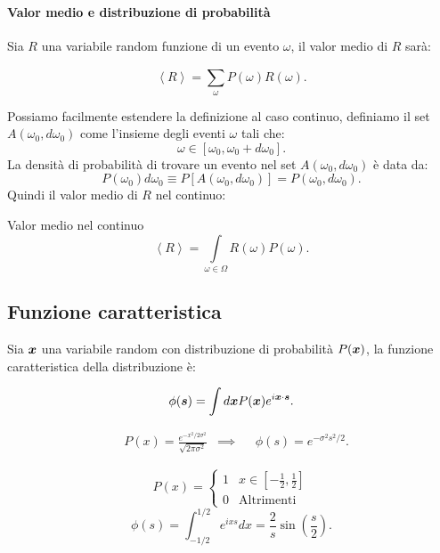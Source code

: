 \paragraph{Valor medio e distribuzione di probabilità}%
\label{par:Valor medio e distribuzione di probabilità}
Sia $R$ una variabile random funzione di un evento $\omega$, il valor medio di $R$ sarà:
\begin{redbox}{}
 \[
    \left<R\right> = \sum_{\omega}^{} P(\omega) R(\omega) 
.\]    
\end{redbox}
\noindent
Possiamo facilmente estendere la definizione al caso continuo, definiamo il set $A(\omega_0, d\omega_0)$ come l'insieme degli eventi $\omega$ tali che:
\[
    \omega  \in \left[\omega_0, \omega_0 + d\omega_0\right]
.\] 
La densità di probabilità di trovare un evento nel set $A(\omega_0, d\omega_0)$ è data da:
\[
    P(\omega_0) d\omega_0 \equiv P\left[A(\omega_0,d\omega_0) \right] = P(\omega_0,d\omega_0) 
.\] 
Quindi il valor medio di $R$ nel continuo:
\begin{redbox}{Valor medio nel continuo}
 \[
    \left<R\right> = \int\limits_{\omega\in \Omega} R(\omega) P(\omega) 
.\]    
\end{redbox}
\subsection{Funzione caratteristica}%
\label{sub:Funzione caratteristica}
Sia $\boldsymbol{x}$ una variabile random con distribuzione di probabilità $P(\boldsymbol{x})$, la funzione caratteristica della distribuzione è:
\begin{redbox}{}
    \[
	\phi (\boldsymbol{s}) = \int d\boldsymbol{x} P(\boldsymbol{x}) e^{i \boldsymbol{x}\cdot \boldsymbol{s}}
    .\] 
\end{redbox}

\begin{exmp}
 \[\begin{aligned}
    &P(x) = \frac{e^{-x^2 / 2 \sigma^2}}{\sqrt{2\pi\sigma^2}} 
    &\implies&
    &\phi (s) = e^{-\sigma^2s^2 / 2}
.\end{aligned}\]
\end{exmp}

\begin{exmp}
\[
    P(x) = 
    \begin{cases}
	1 & x \in \left[-\frac{1}{2}, \frac{1}{2}\right]\\
	0 & \text{Altrimenti}
    \end{cases}
\] 
\[
    \phi (s) = \int_{-1 /2}^{1 /2} e^{ixs}dx = \frac{2}{s}\sin\left(\frac{s}{2}\right)  
.\] 
\end{exmp}

